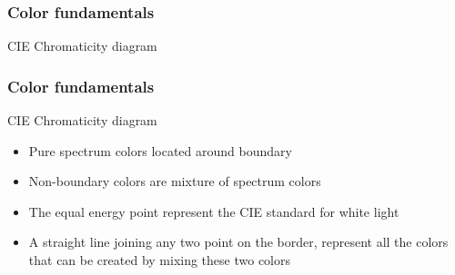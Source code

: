 \documentclass{beamer}
\begin{document}
\begin{frame}
\frametitle{Color fundamentals}
\begin{block}{CIE Chromaticity diagram}
\end{block}
\end{frame}
\begin{frame}
\frametitle{Color fundamentals}
\begin{block}{CIE Chromaticity diagram}
\begin{itemize}
	\item Pure spectrum colors located around boundary 
	\item Non-boundary colors are mixture of spectrum colors
	\item The equal energy point represent the CIE standard for white light 
	\item A straight line joining any two point on the border, represent all the colors that can be created by mixing these two colors
\end{itemize}
\end{block}
\end{frame}
\end{document}
